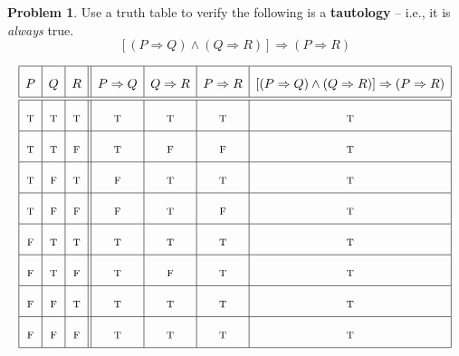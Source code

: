\documentclass[12pt]{amsart}
\newcounter{problem_number}[section]
\theoremstyle{named}
\theoremstyle{definition}
\newtheorem{problem}{Problem}
\begin{document}
\begin{problem}
	Use a truth table to verify the following is a \textbf{tautology} -- i.e., it is \emph{always} true.
	$$[(P\Rightarrow Q)\wedge(Q\Rightarrow R)]\Rightarrow (P\Rightarrow R)$$
\end{problem}

$$
\renewcommand{\arraystretch}{2}
\begin{array}{|c|c|c||c|c|c|c|}
\hline
P&Q&R&P\Rightarrow Q&Q\Rightarrow R&P\Rightarrow R& [(P\Rightarrow Q)\wedge(Q\Rightarrow R)]\Rightarrow (P\Rightarrow R)\\
\hline\hline
\textsc{t}&\textsc{t}&\textsc{t}&\textsc{t} &\textsc{t} &\textsc{t} &\textsc{t} \\
\hline
\textsc{t}&\textsc{t}&\textsc{f}&\textsc{t} &\textsc{f} &\textsc{f} &\textsc{t} \\
\hline
\textsc{t}&\textsc{f}&\textsc{t}&\textsc{f} &\textsc{t} &\textsc{t} &\textsc{t} \\
\hline
\textsc{t}&\textsc{f}&\textsc{f}&\textsc{f} &\textsc{t} &\textsc{f} &\textsc{t} \\
\hline
\textsc{f}&\textsc{t}&\textsc{t}&\textsc{t} &\textsc{t} &\textsc{t} &\textsc{t} \\
\hline
\textsc{f}&\textsc{t}&\textsc{f}&\textsc{t} &\textsc{f} &\textsc{t} &\textsc{t} \\
\hline
\textsc{f}&\textsc{f}&\textsc{t}&\textsc{t} &\textsc{t} &\textsc{t} &\textsc{t} \\
\hline
\textsc{f}&\textsc{f}&\textsc{f}&\textsc{t} &\textsc{t} &\textsc{t} &\textsc{t} \\
\hline
\end{array}
$$


\end{document}
